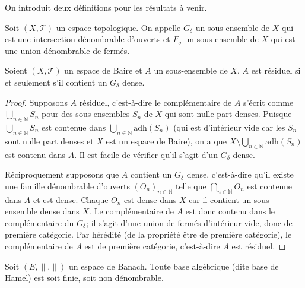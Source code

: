 On introduit deux définitions pour les résultats à venir.
\begin{df}
  Soit $(X, \mathcal{T})$ un espace topologique. On appelle $G_\delta$ un
  sous-ensemble de $X$ qui est une intersection dénombrable d'ouverts et
  $F_\sigma$ un sous-ensemble de $X$ qui est une union dénombrable de fermés.
\end{df}

\begin{prop}
  Soient $(X, \mathcal{T})$ un espace de Baire et $A$ un sous-ensemble
  de $X$. $A$ est résiduel si et seulement s'il contient un $G_\delta$
  dense.
\end{prop}

\begin{proof}
  Supposons $A$ résiduel, c'est-à-dire le complémentaire de $A$
  s'écrit comme $\bigcup_{n\in\mathbb N} S_n$ pour des sous-ensembles
  $S_n$ de $X$ qui sont nulle part denses. Puisque $\bigcup_{n\in\mathbb N} S_n$
  est contenue dans $\bigcup_{n\in\mathbb N} \mathrm{adh}(S_n)$ (qui est d'intérieur
  vide car les $S_n$ sont nulle part denses et $X$ est un espace de Baire),
  on a que $X\setminus \bigcup_{n\in\mathbb N} \mathrm{adh}(S_n)$ est contenu
  dans $A$. Il est facile de vérifier qu'il s'agit d'un $G_\delta$ dense.

  Réciproquement supposons que $A$ contient un $G_\delta$ dense, c'est-à-dire
  qu'il existe une famille dénombrable d'ouverts $(O_n)_{n\in\mathbb N}$ telle
  que $\bigcap_{n\in\mathbb N}O_n$ est contenue dans $A$ et est dense. Chaque
  $O_n$ est dense dans $X$ car il contient un sous-ensemble dense dans $X$.
  Le complémentaire de $A$ est donc contenu dans le complémentaire du
  $G_\delta$; il s'agit d'une union de fermés d'intérieur vide, donc
  de première catégorie. Par hérédité
  (de la propriété \og être de première catégorie\fg), le complémentaire
  de $A$ est de première catégorie, c'est-à-dire $A$ est résiduel.
\end{proof}

\begin{prop}\label{baire:base}
  Soit $(E, \|.\|)$ un espace de Banach. Toute base algébrique
  (dite base de Hamel) est soit finie, soit non dénombrable.
\end{prop}

